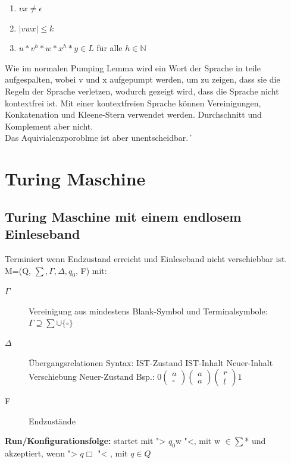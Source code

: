 \documentclass[12pt,a4paper]{article}
\begin{document}
	\begin{enumerate}
	\item $vx \neq \epsilon$
	\item $|vwx| \leq k$
	\item $u*v^h*w*x^h*y \in L $ für alle $h \in \mathbb{N}$
	\end{enumerate}
Wie im normalen Pumping Lemma wird ein Wort der Sprache in teile aufgespalten, wobei v und x aufgepumpt werden, um zu zeigen, dass sie die Regeln der Sprache verletzen, wodurch gezeigt wird, dass die Sprache nicht kontextfrei ist.\newline
Mit einer kontextfreien Sprache können Vereinigungen, Konkatenation und Kleene-Stern verwendet werden. Durchschnitt und Komplement aber nicht.\\
Das Aquivialenzporoblme ist aber unentscheidbar.´
	

\section{Turing Maschine}
	\subsection{Turing Maschine mit einem endlosem Einleseband}
	Terminiert wenn Endzustand erreicht und Einleseband nicht verschiebbar ist.\\
	M=(Q, $\sum, \Gamma , \Delta , q_0$, F) mit:\\
	\begin{description}
		\item[$\Gamma$] Vereinigung aus mindestens Blank-Symbol und Terminalsymbole: $\Gamma \supseteq \sum \cup \{ \square \} $
		\item[$\Delta$] Übergangsrelationen Syntax: IST-Zustand IST-Inhalt Neuer-Inhalt Verschiebung Neuer-Zustand Bsp.: $0 \left( \begin{array}{c} a \\ \square \end{array}\right) \left( \begin{array}{c} a \\ a \end{array}\right) \left( \begin{array}{c} r \\ l \end{array} \right) 1$
		\item[F] Endzustände
	\end{description}
	\textbf{Run/Konfigurationsfolge:} startet mit "> $q_0$w "<, mit w $\in \sum$* und akzeptiert, wenn "> $q \Box $ "< , mit $q \in Q$ 
\end{document}
